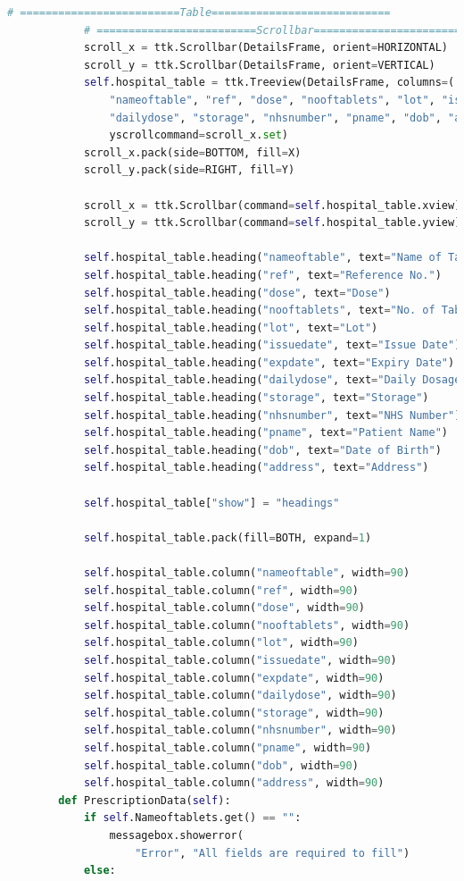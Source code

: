 \documentclass{article}
\begin{document}
\begin{lstlisting}[language=Python, caption=Hospital Management.py]
			# =========================Table============================
			# =========================Scrollbar========================
			scroll_x = ttk.Scrollbar(DetailsFrame, orient=HORIZONTAL)
			scroll_y = ttk.Scrollbar(DetailsFrame, orient=VERTICAL)
			self.hospital_table = ttk.Treeview(DetailsFrame, columns=(
				"nameoftable", "ref", "dose", "nooftablets", "lot", "issuedate", "expdate",
				"dailydose", "storage", "nhsnumber", "pname", "dob", "address"), xscrollcommand=scroll_y.set,
				yscrollcommand=scroll_x.set)
			scroll_x.pack(side=BOTTOM, fill=X)
			scroll_y.pack(side=RIGHT, fill=Y)
	
			scroll_x = ttk.Scrollbar(command=self.hospital_table.xview)
			scroll_y = ttk.Scrollbar(command=self.hospital_table.yview)
	
			self.hospital_table.heading("nameoftable", text="Name of Tablets")
			self.hospital_table.heading("ref", text="Reference No.")
			self.hospital_table.heading("dose", text="Dose")
			self.hospital_table.heading("nooftablets", text="No. of Tablets")
			self.hospital_table.heading("lot", text="Lot")
			self.hospital_table.heading("issuedate", text="Issue Date")
			self.hospital_table.heading("expdate", text="Expiry Date")
			self.hospital_table.heading("dailydose", text="Daily Dosage")
			self.hospital_table.heading("storage", text="Storage")
			self.hospital_table.heading("nhsnumber", text="NHS Number")
			self.hospital_table.heading("pname", text="Patient Name")
			self.hospital_table.heading("dob", text="Date of Birth")
			self.hospital_table.heading("address", text="Address")
	
			self.hospital_table["show"] = "headings"
	
			self.hospital_table.pack(fill=BOTH, expand=1)
	
			self.hospital_table.column("nameoftable", width=90)
			self.hospital_table.column("ref", width=90)
			self.hospital_table.column("dose", width=90)
			self.hospital_table.column("nooftablets", width=90)
			self.hospital_table.column("lot", width=90)
			self.hospital_table.column("issuedate", width=90)
			self.hospital_table.column("expdate", width=90)
			self.hospital_table.column("dailydose", width=90)
			self.hospital_table.column("storage", width=90)
			self.hospital_table.column("nhsnumber", width=90)
			self.hospital_table.column("pname", width=90)
			self.hospital_table.column("dob", width=90)
			self.hospital_table.column("address", width=90)
		def PrescriptionData(self):
			if self.Nameoftablets.get() == "":
				messagebox.showerror(
					"Error", "All fields are required to fill")
			else:
				

\end{lstlisting}
\end{document}
